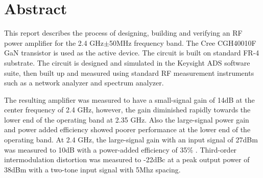\chapter{Abstract}
This report describes the process of designing, building and verifying an RF power amplifier for the 2.4 GHz$\pm$50MHz frequency band. The Cree CGH40010F GaN transistor is used as the active device. The circuit is built on standard FR-4 substrate. The circuit is designed and simulated in the Keysight ADS software suite, then built up and measured using standard RF measurement instruments such as a network analyzer and spectrum analyzer.

The resulting amplifier was measured to have a small-signal gain of 14dB at the center frequency of 2.4 GHz, however, the gain diminished rapidly towards the lower end of the operating band at 2.35 GHz. Also the large-signal power gain and power added efficiency showed poorer performance at the lower end of the operating band. At 2.4 GHz, the large-signal gain with an input signal of 27dBm was measured to 10dB with a power-added efficiency of 35\% . Third-order intermodulation distortion was measured to -22dBc at a peak output power of 38dBm with a two-tone input signal with 5Mhz spacing.

